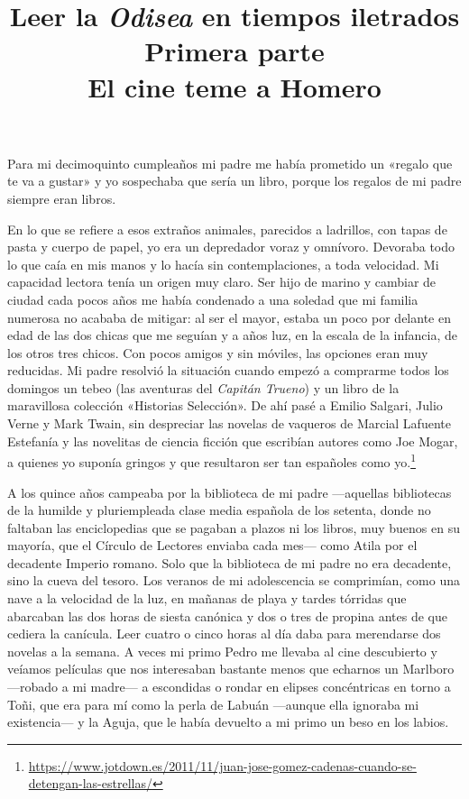 \documentclass[11pt,a4paper]{article}
\title{Leer la \emph{Odisea} en tiempos iletrados \\ Primera parte \\ El cine teme a Homero}
\author{}
\date{}
\begin{document}
\maketitle


Para mi decimoquinto cumpleaños mi padre me había prometido un «regalo que te va a gustar» y yo sospechaba que sería un libro, porque los regalos de mi padre siempre eran libros.

En lo que se refiere a esos extraños animales, parecidos a ladrillos, con tapas de pasta y cuerpo de papel, yo era un depredador voraz y omnívoro. Devoraba todo lo que caía en mis manos y lo hacía sin contemplaciones, a toda velocidad. Mi capacidad lectora tenía un origen muy claro. Ser hijo de marino y cambiar de ciudad cada pocos años me había condenado a una soledad que mi familia numerosa no acababa de mitigar: al ser el mayor, estaba un poco por delante en edad de las dos chicas que me seguían y a años luz, en la escala de la infancia, de los otros tres chicos. Con pocos amigos y sin móviles, las opciones eran muy reducidas. Mi padre resolvió la situación cuando empezó a comprarme todos los domingos un tebeo (las aventuras del \emph{Capitán Trueno}) y un libro de la maravillosa colección «Historias Selección». De ahí pasé a Emilio Salgari, Julio Verne y Mark Twain, sin despreciar las novelas de vaqueros de Marcial Lafuente Estefanía y las novelitas de ciencia ficción que escribían autores como Joe Mogar, a quienes yo suponía gringos y que resultaron ser tan españoles como yo.\footnote{\url{https://www.jotdown.es/2011/11/juan-jose-gomez-cadenas-cuando-se-detengan-las-estrellas/}}

A los quince años campeaba por la biblioteca de mi padre ---aquellas bibliotecas de la humilde y pluriempleada clase media española de los setenta, donde no faltaban las enciclopedias que se pagaban a plazos ni los libros, muy buenos en su mayoría, que el Círculo de Lectores enviaba cada mes--- como Atila por el decadente Imperio romano. Solo que la biblioteca de mi padre no era decadente, sino la cueva del tesoro. Los veranos de mi adolescencia se comprimían, como una nave a la velocidad de la luz, en mañanas de playa y tardes tórridas que abarcaban las dos horas de siesta canónica y dos o tres de propina antes de que cediera la canícula. Leer cuatro o cinco horas al día daba para merendarse dos novelas a la semana. A veces mi primo Pedro me llevaba al cine descubierto y veíamos películas que nos interesaban bastante menos que echarnos un Marlboro ---robado a mi madre--- a escondidas o rondar en elipses concéntricas en torno a Toñi, que era para mí como la perla de Labuán ---aunque ella ignoraba mi existencia--- y la Aguja, que le había devuelto a mi primo un beso en los labios.
\end{document}
